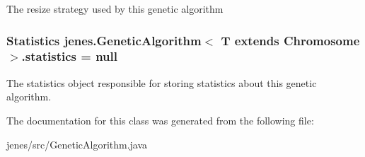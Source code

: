 The resize strategy used by this genetic algorithm \hypertarget{classjenes_1_1_genetic_algorithm_3_01_t_01extends_01_chromosome_01_4_afc23d5cbab5434f5ec5684cda9434b93}{
\subsubsection[{statistics}]{\setlength{\rightskip}{0pt plus 5cm}Statistics jenes.\-Genetic\-Algorithm$<$ T extends Chromosome $>$.statistics = null\hspace{0.3cm}{\ttfamily [protected]}}}\label{classjenes_1_1_genetic_algorithm_3_01_t_01extends_01_chromosome_01_4_afc23d5cbab5434f5ec5684cda9434b93}
The statistics object responsible for storing statistics about this genetic algorithm. 

The documentation for this class was generated from the following file\-:\begin{DoxyCompactItemize}
\item 
jenes/src/Genetic\-Algorithm.\-java\end{DoxyCompactItemize}
